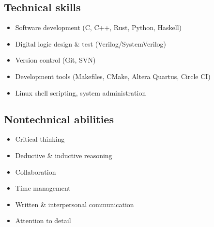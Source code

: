 
\vspace{-1.2em}

\begin{multicols}{2}
  \subsection*{Technical skills}

  \begin{itemize}
    \item Software development (C, C++, Rust, Python, Haskell)
    \item Digital logic design \& test (Verilog/SystemVerilog)
    \item Version control (Git, SVN)
    \item Development tools (Makefiles, CMake, Altera Quartus, Circle CI)
    \item Linux shell scripting, system administration
  \end{itemize}

  \vfill\null
  \columnbreak

  \subsection*{Nontechnical abilities}

  \begin{itemize}
    \item Critical thinking
    \item Deductive \& inductive reasoning
    \item Collaboration
    \item Time management
    \item Written \& interpersonal communication
    \item Attention to detail
  \end{itemize}

  \vfill\null
\end{multicols}
